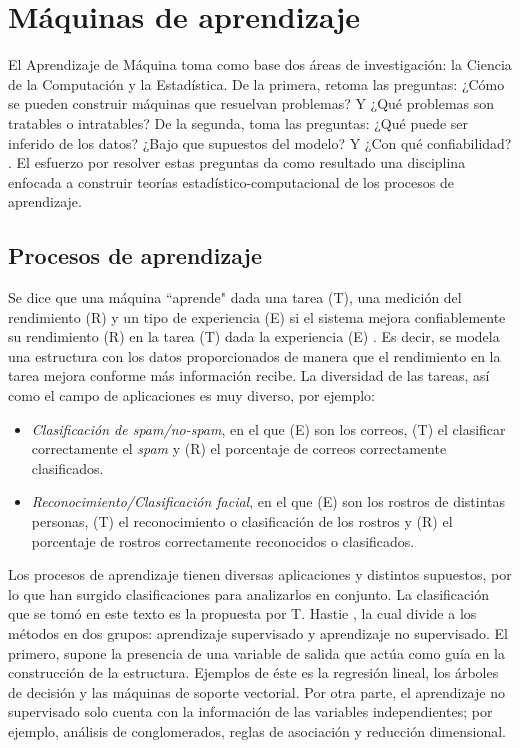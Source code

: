 \chapter{Máquinas de aprendizaje}
\label{ch:chapter1}


El Aprendizaje de Máquina toma como base dos áreas de investigación:
la Ciencia de la Computación y la Estadística. De la primera, retoma las preguntas: ¿Cómo se pueden construir máquinas que resuelvan problemas? Y ¿Qué problemas son tratables o intratables? De la segunda, toma las preguntas: ¿Qué puede ser inferido de los datos? ¿Bajo que supuestos del modelo? Y ¿Con qué confiabilidad? \cite{mitchell2006discipline}. El esfuerzo por resolver estas preguntas da como resultado una disciplina enfocada a construir teorías estadístico-computacional de los procesos de aprendizaje.

\section{Procesos de aprendizaje}

Se dice que una máquina ``aprende" dada una tarea (T), una medición del rendimiento (R) y un tipo de experiencia (E) si el sistema mejora confiablemente su rendimiento (R) en la tarea (T) dada la experiencia (E) \cite{mitchell2006discipline}. Es decir, se modela una estructura con los datos proporcionados de manera que el rendimiento en la tarea mejora conforme más información recibe. La diversidad de las tareas, así como el campo de aplicaciones es muy diverso, por ejemplo:

\begin{itemize} 

\item \textit{Clasificación de spam/no-spam}, en el que (E) son los correos, (T) el clasificar correctamente el \textit{spam} y (R) el porcentaje de correos correctamente clasificados.

\item \textit{Reconocimiento/Clasificación facial}, en el que (E) son los rostros de distintas personas, (T) el reconocimiento o clasificación de los rostros y (R) el porcentaje de rostros correctamente reconocidos o clasificados.

\end{itemize} 

Los procesos de aprendizaje tienen diversas aplicaciones y distintos supuestos, por lo que han surgido clasificaciones para analizarlos en conjunto. La clasificación que se tomó en este texto es la propuesta por T. Hastie \cite{hastie2009elements}, la cual divide a los métodos en dos grupos: aprendizaje supervisado y aprendizaje no supervisado. El primero, supone la presencia de una variable de salida que actúa como guía en la construcción de la estructura. Ejemplos de éste es la regresión lineal, los árboles de decisión y las máquinas de soporte vectorial. Por otra parte, el aprendizaje no supervisado solo cuenta con la información de las variables independientes; por ejemplo, análisis de conglomerados, reglas de asociación y reducción dimensional. 

